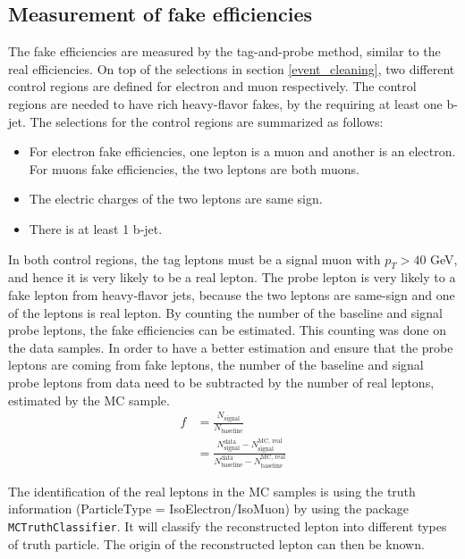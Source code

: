\subsection{Measurement of fake efficiencies}
The fake efficiencies are measured by the tag-and-probe method, similar to the real efficiencies.
On top of the selections in section \ref{event_cleaning}, two different control regions are defined for electron and muon respectively.
The control regions are needed to have rich heavy-flavor fakes, by the requiring at least one b-jet.
The selections for the control regions are summarized as follows:
\begin{itemize}
\item For electron fake efficiencies, one lepton is a muon and another is an electron. For muons fake efficiencies, the two leptons are both muons.
\item The electric charges of the two leptons are same sign.
\item There is at least 1 b-jet.
\end{itemize}

In both control regions, the tag leptons must be a signal muon with $p_T > 40$ GeV, and hence it is very likely to be a real lepton.
The probe lepton is very likely to a fake lepton from heavy-flavor jets, because the two leptons are same-sign and one of the leptons is real lepton.
By counting the number of the baseline and signal probe leptons, the fake efficiencies can be estimated.
This counting was done on the data samples.
In order to have a better estimation and ensure that the probe leptons are coming from fake leptons, the number of the baseline and signal probe leptons from data need to be subtracted by the number of real leptons, estimated by the MC sample.
\begin{align}
f &= \frac{N_{\text{signal}}}{N_{\text{baseline}}} \\
&= \frac{N^{\text{data}}_{\text{signal}} - N^{\text{MC, real}}_{\text{signal}}}{N^{\text{data}}_{\text{baseline}} - N^{\text{MC, real}}_{\text{baseline}}}
\end{align}

The identification of the real leptons in the MC samples is using the truth information (ParticleType = IsoElectron/IsoMuon) by using the package \texttt{MCTruthClassifier}.
It will classify the reconstructed lepton into different types of truth particle.
The origin of the reconstructed lepton can then be known.

